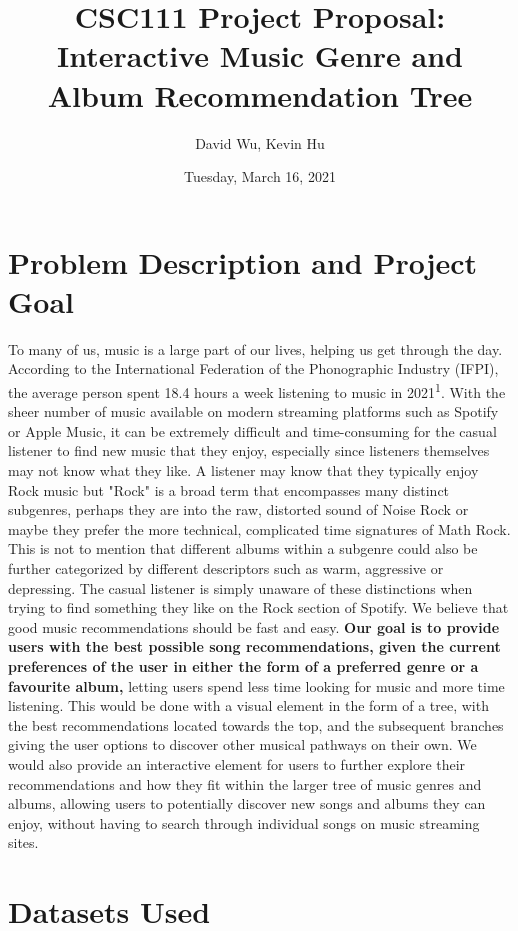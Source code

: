 \documentclass[fontsize=11pt]{article}
\title{CSC111 Project Proposal: Interactive Music Genre and Album Recommendation Tree}
\author{David Wu, Kevin Hu}
\date{Tuesday, March 16, 2021}
\begin{document}
  
\maketitle  
  
\section*{Problem Description and Project Goal}  
  
To many of us, music is a large part of our lives, helping us get through the day. According to the International Federation of the Phonographic Industry (IFPI), the average person spent 18.4 hours a week listening to music in 2021\textsuperscript{1}. With the sheer number of music available on modern streaming platforms such as Spotify or Apple Music, it can be extremely difficult and time-consuming for the casual listener to find new music that they enjoy, especially since listeners themselves may not know what they like. A listener may know that they typically enjoy Rock music but "Rock" is a broad term that encompasses many distinct subgenres, perhaps they are into the raw, distorted sound of Noise Rock or maybe they prefer the more technical, complicated time signatures of Math Rock. This is not to mention that different albums within a subgenre could also be further categorized by different descriptors such as warm, aggressive or depressing. The casual listener is simply unaware of these distinctions when trying to find something they like on the Rock section of Spotify. We believe that good music recommendations should be fast and easy. \textbf{Our goal is to provide users with the best possible song recommendations, given the current preferences of the user in either the form of a preferred genre or a favourite album,} letting users spend less time looking for music and more time listening. This would be done with a visual element in the form of a tree, with the best recommendations located towards the top, and the subsequent branches giving the user options to discover other musical pathways on their own. We would also provide an interactive element for users to further explore their recommendations and how they fit within the larger tree of music genres and albums, allowing users to potentially discover new songs and albums they can enjoy, without having to search through individual songs on music streaming sites.  
  

  
\section*{Datasets Used}
\end{document}

